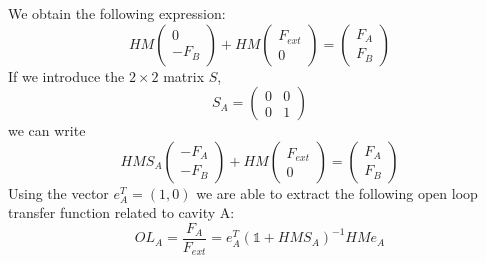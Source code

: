 We obtain the following expression:
\begin{equation}
HM
\left( \begin{array}{c}
0\\ -F_B
\end{array} \right)
+
HM
\left( \begin{array}{c}
F_{ext}\\0
\end{array} \right)
=
\left( \begin{array}{c}
F_A\\F_B
\end{array} \right)
\end{equation}
If we introduce the $2\times2$ matrix $S$,
\begin{equation}
S_A=
\left( \begin{array}{cc}
0 & 0\\
0 & 1
\end{array} \right)
\end{equation}
we can  write
\begin{equation}
HMS_A
\left( \begin{array}{c}
- F_A\\ - F_B
\end{array} \right)
+
HM
\left( \begin{array}{c}
F_{ext}\\0
\end{array} \right)
=
\left( \begin{array}{c}
F_A\\F_B
\end{array} \right)
\end{equation}
Using the vector $e_A^{T}=(1,0)$ we are able to extract the following open loop
transfer function related to cavity A:
\begin{equation}
OL_{A}=\frac{F_{A}}{F_{ext}}=e_A^{T}(\mathds{1}+HMS_A)^{-1}HMe_A
\end{equation}


